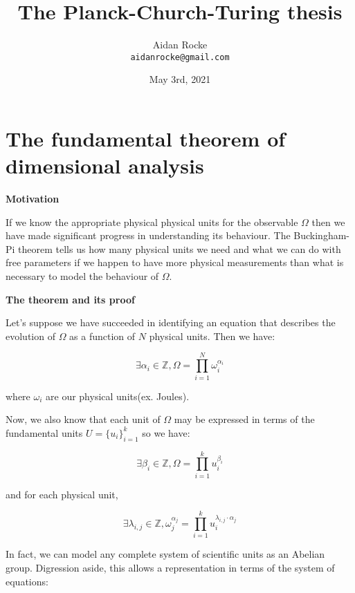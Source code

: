 \documentclass{article}
\title{The Planck-Church-Turing thesis}
\date{May 3rd, 2021}
\author{%
  Aidan Rocke\\
  \texttt{aidanrocke@gmail.com} \\
}
\begin{document}

\maketitle


\newpage 

\tableofcontents

\newpage 

\section{The fundamental theorem of dimensional analysis}

\textbf{Motivation}

If we know the appropriate physical physical units for the observable $\Omega$ then we have made significant
progress in understanding its behaviour. The Buckingham-Pi theorem tells us how many physical units we need
and what we can do with free parameters if we happen to have more physical measurements than what is necessary
to model the behaviour of $\Omega$.

\textbf{The theorem and its proof}

Let's suppose we have succeeded in identifying an equation that describes the evolution of $\Omega$ as a function
of $N$ physical units. Then we have:

\begin{equation}
\exists \alpha_i \in \mathbb{Z}, \Omega = \prod_{i=1}^N \omega_i^{\alpha_i}
\end{equation}

where $\omega_i$ are our physical units(ex. Joules).

Now, we also know that each unit of $\Omega$ may be expressed in terms of the fundamental units $U = \{u_i\}_{i=1}^k$
so we have:

\begin{equation}
\exists \beta_i \in \mathbb{Z}, \Omega = \prod_{i=1}^k u_i^{\beta_i}
\end{equation}

and for each physical unit,

\begin{equation}
\exists \lambda_{i,j} \in \mathbb{Z}, \omega_j^{\alpha_j} = \prod_{i=1}^k u_i^{\lambda_{i,j} \cdot \alpha_j}
\end{equation}

In fact, we can model any complete system of scientific units as an Abelian group. Digression aside, this allows a representation in terms of the system of equations:
\end{document}

